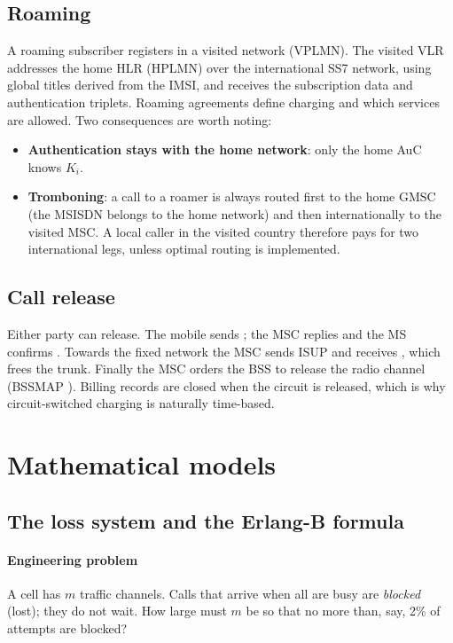 \documentclass[11pt,a4paper]{article}
\begin{document}
\subsection{Roaming}
A roaming subscriber registers in a visited network (VPLMN). The visited VLR addresses
the home HLR (HPLMN) over the international SS7 network, using global titles derived from
the IMSI, and receives the subscription data and authentication triplets. Roaming
agreements define charging and which services are allowed. Two consequences are worth
noting:
\begin{itemize}
  \item \textbf{Authentication stays with the home network}: only the home AuC knows $K_i$.
  \item \textbf{Tromboning}: a call to a roamer is always routed first to the home GMSC
        (the MSISDN belongs to the home network) and then internationally to the visited
        MSC. A local caller in the visited country therefore pays for two international
        legs, unless optimal routing is implemented.
\end{itemize}

\subsection{Call release}
Either party can release. The mobile sends ; the MSC replies
 and the MS confirms . Towards the fixed network the MSC
sends ISUP  and receives , which frees the trunk. Finally the MSC orders
the BSS to release the radio channel (BSSMAP ). Billing records are
closed when the circuit is released, which is why circuit-switched charging is naturally
time-based.

\section{Mathematical models}

\subsection{The loss system and the Erlang-B formula}\label{sec:erlangb}
\paragraph{Engineering problem} A cell has $m$ traffic channels. Calls that arrive when all
are busy are \emph{blocked} (lost); they do not wait. How large must $m$ be so that no more
than, say, 2\% of attempts are blocked?
\end{document}
